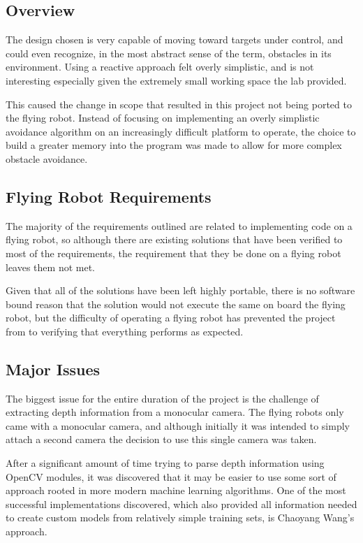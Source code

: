 \documentclass{article}[12]
\begin{document}
\subsection{Overview}

	The design chosen is very capable of moving toward targets under control, and could even recognize, in the most abstract sense of the term, obstacles in its environment. Using a reactive approach felt overly simplistic, and is not interesting especially given the extremely small working space the lab provided.
	
	This caused the change in scope that resulted in this project not being ported to the flying robot. Instead of focusing on implementing an overly simplistic avoidance algorithm on an increasingly difficult platform to operate, the choice to build a greater memory into the program was made to allow for more complex obstacle avoidance.
	
	
\subsection{Flying Robot Requirements}

The majority of the requirements outlined are related to implementing code on a flying robot, so although there are existing solutions that have been verified to most of the requirements, the requirement that they be done on a flying robot leaves them not met.

Given that all of the solutions have been left highly portable, there is no software bound reason that the solution would not execute the same on board the flying robot, but the difficulty of operating a flying robot has prevented the project from to verifying that everything performs as expected.

\subsection{Major Issues}

The biggest issue for the entire duration of the project is the challenge of extracting depth information from a monocular camera. The flying robots only came with a monocular camera, and although initially it was intended to simply attach a second camera the decision to use this single camera was taken.

After a significant amount of time trying to parse depth information using OpenCV modules, it was discovered that it may be easier to use some sort of approach rooted in more modern machine learning algorithms. One of the most successful implementations discovered, which also provided all information needed to create custom models from relatively simple training sets, is Chaoyang Wang's approach.\cite{Wang_2018_CVPR} 
\end{document}
